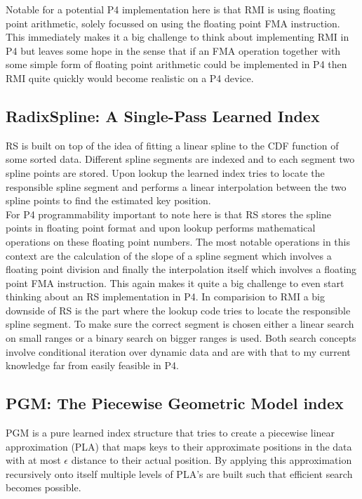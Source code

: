 Notable for a potential P4 implementation here is that RMI is using floating point arithmetic, solely focussed on using the floating point FMA instruction. This immediately makes it a big challenge to think about implementing RMI in P4 but leaves some hope in the sense that if an FMA operation together with some simple form of floating point arithmetic could be implemented in P4 then RMI quite quickly would become realistic on a P4 device.

\subsection{RadixSpline: A Single-Pass Learned Index}
RS \cite{radixspline} is built on top of the idea of fitting a linear spline to the CDF function of some sorted data. Different spline segments are indexed and to each segment two spline points are stored. Upon lookup the learned index tries to locate the responsible spline segment and performs a linear interpolation between the two spline points to find the estimated key position.\\

For P4 programmability important to note here is that RS stores the spline points in floating point format and upon lookup performs mathematical operations on these floating point numbers. The most notable operations in this context are the calculation of the slope of a spline segment which involves a floating point division and finally the interpolation itself which involves a floating point FMA instruction. This again makes it quite a big challenge to even start thinking about an RS implementation in P4. In comparision to RMI a big downside of RS is the part where the lookup code tries to locate the responsible spline segment. To make sure the correct segment is chosen either a linear search on small ranges or a binary search on bigger ranges is used. Both search concepts involve conditional iteration over dynamic data and are with that to my current knowledge far from easily feasible in P4.

\subsection{PGM: The Piecewise Geometric Model index}
PGM \cite{pgm} is a pure learned index structure that tries to create a piecewise linear approximation (PLA) that maps keys to their approximate positions in the data with at most $\epsilon$ distance to their actual position. By applying this approximation recursively onto itself multiple levels of PLA's are built such that efficient search becomes possible.\\

